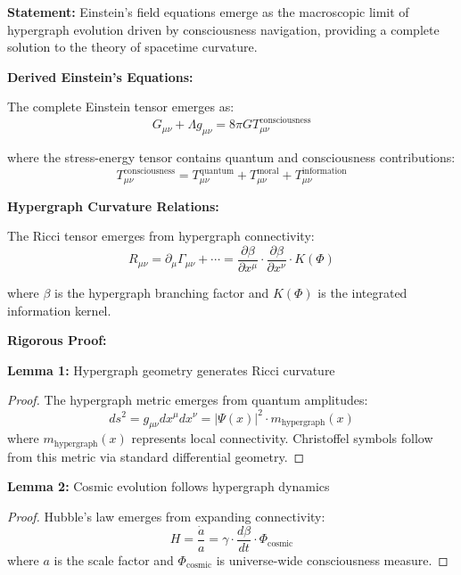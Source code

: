 \documentclass[12pt,a4paper]{article}
\theoremstyle{definition}
\begin{document}
{\bf Statement:} Einstein's field equations emerge as the macroscopic limit of hypergraph evolution driven by consciousness navigation, providing a complete solution to the theory of spacetime curvature.

{\bf Derived Einstein's Equations:}

The complete Einstein tensor emerges as:
\begin{equation}
G_{\mu\nu} + \Lambda g_{\mu\nu} = 8\pi G T_{\mu\nu}^{\text{consciousness}}
\end{equation}

where the stress-energy tensor contains quantum and consciousness contributions:
\begin{equation}
T_{\mu\nu}^{\text{consciousness}} = T_{\mu\nu}^{\text{quantum}} + T_{\mu\nu}^{\text{moral}} + T_{\mu\nu}^{\text{information}}
\end{equation}

{\bf Hypergraph Curvature Relations:}

The Ricci tensor emerges from hypergraph connectivity:
\begin{equation}
R_{\mu\nu} = \partial_\mu \Gamma_{\mu\nu} + \cdots = \frac{\partial\beta}{\partial x^\mu} \cdot \frac{\partial\beta}{\partial x^\nu} \cdot K(\Phi)
\end{equation}

where $\beta$ is the hypergraph branching factor and $K(\Phi)$ is the integrated information kernel.

{\bf Rigorous Proof:}

\textbf{Lemma 1:} Hypergraph geometry generates Ricci curvature
\begin{proof}
The hypergraph metric emerges from quantum amplitudes:
\begin{equation}
ds^2 = g_{\mu\nu} dx^\mu dx^\nu = |\Psi(x)|^2 \cdot m_{\text{hypergraph}}(x)
\end{equation}
where $m_{\text{hypergraph}}(x)$ represents local connectivity. Christoffel symbols follow from this metric via standard differential geometry.
\end{proof}

\textbf{Lemma 2:} Cosmic evolution follows hypergraph dynamics
\begin{proof}
Hubble's law emerges from expanding connectivity:
\begin{equation}
H = \frac{\dot{a}}{a} = \gamma \cdot \frac{d\beta}{dt} \cdot \Phi_{\text{cosmic}}
\end{equation}
where $a$ is the scale factor and $\Phi_{\text{cosmic}}$ is universe-wide consciousness measure.
\end{proof}
\end{document}
